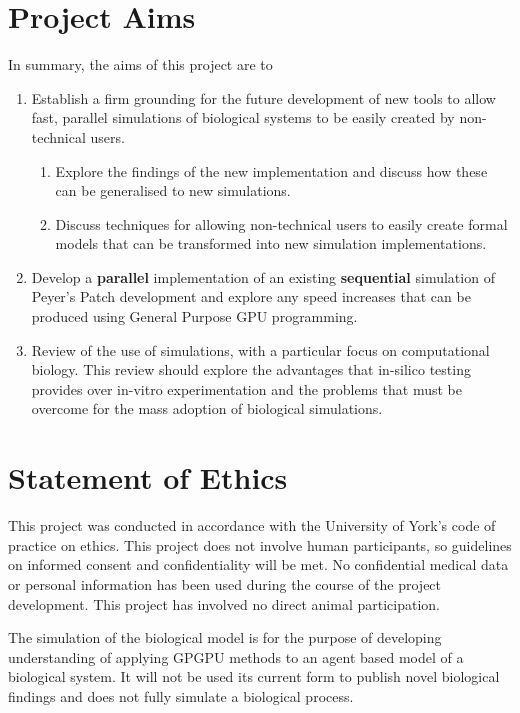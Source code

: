 \documentclass{UoYCSproject}
\begin{document}
\section{Project Aims}
In summary, the aims of this project are to
\begin{enumerate}
	\item Establish a firm grounding for the future development of new tools to allow fast, parallel simulations of biological systems to be easily created by non-technical users.
	\begin{enumerate}
		\item Explore the findings of the new implementation and discuss how these can be generalised to new simulations.
		\item Discuss techniques for allowing non-technical users to easily create formal models that can be transformed into new simulation implementations.
	\end{enumerate}
	\item Develop a \textbf{parallel} implementation of an existing \textbf{sequential} simulation of Peyer's Patch development and explore any speed increases that can be produced using General Purpose GPU programming.
	\item Review of the use of simulations, with a particular focus on computational biology. This review should explore the advantages that in-silico testing provides over in-vitro experimentation and the problems that must be overcome for the mass adoption of biological simulations.
	
\end{enumerate}

\section{Statement of Ethics}
This project was conducted in accordance with the University of York's code of practice on ethics.
This project does not involve human participants, so guidelines on informed consent and confidentiality will be met. No confidential medical data or personal information has been used during the course of the project development. This project has involved no direct animal participation.

The simulation of the biological model is for the purpose of developing understanding of applying GPGPU methods to an agent based model of a biological system. It will not be used its current form to publish novel biological findings and does not fully simulate a biological process.%
\end{document}
